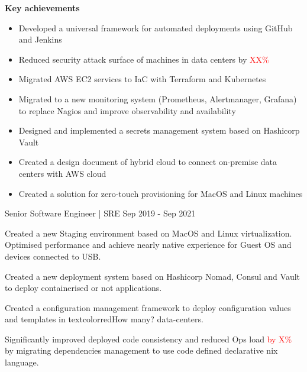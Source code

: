 \begin{cventries}
{\begin{itemize}
        \end{itemize}
        \textbf{Key achievements}
        \begin{itemize}
            \item {Developed a universal framework for automated deployments using GitHub and Jenkins}
            \item {Reduced security attack surface of machines in data centers by \textcolor{red}{XX\%}}
            \item {Migrated AWS EC2 services to IaC with Terraform and Kubernetes}
            \item {Migrated to a new monitoring system (Prometheus, Alertmanager, Grafana) to replace Nagios and improve observability and availability}
            \item {Designed and implemented a secrets management system based on Hashicorp Vault}
            \item {Created a design document of hybrid cloud to connect on-premise data centers with AWS cloud}
            \item {Created a solution for zero-touch provisioning for MacOS and Linux machines}
        \end{itemize}
    }

    \cventry
    {Senior Software Engineer | SRE} %
    {} %
    {} %
    {Sep 2019 - Sep 2021} %
    {
      \begin{cvitems} %
        \item {Created a new Staging environment based on MacOS and Linux virtualization. Optimised performance and achieve nearly native experience for Guest OS and devices connected to USB.}
        \item {Created a new deployment system based on Hashicorp Nomad, Consul and Vault to deploy containerised or not applications.}
        \item {Created a configuration management framework to deploy configuration values and templates in textcolor{red}{How many?} data-centers.}
        \item {Significantly improved deployed code consistency and reduced Ops load \textcolor{red}{by X\%} by migrating dependencies management to use code defined declarative nix language.}
      \end{cvitems}
    }


\end{cventries}
